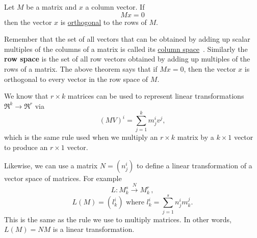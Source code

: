 \begin{theorem}
Let $M$ be a matrix and $x$ a column vector. If 
$$
Mx=0
$$
then the vector $x$ is \hyperlink{orthog}{orthogonal} to the rows of $M$.
\end{theorem}

\begin{remark}
Remember that the set of all vectors that can be obtained by adding up scalar multiples of the columns of a matrix is called its \hyperlink{column space}{column space}~. Similarly the {\bf row space} is the set of all row vectors obtained by adding up multiples of the rows of a matrix. The above theorem says that if $Mx=0$, then the vector $x$ is orthogonal to every vector in the row space of $M$.
\end{remark}



We know that $r\times k$ matrices can be used to represent linear transformations 
$ \Re^k \rightarrow \Re^r $
via $$(MV)^i = \sum_{j=1}^{k} m_j^iv^j , $$ which is the same rule used when we multiply an $r\times k$ matrix by a $k\times 1$ vector to produce an $r\times1$ vector.

Likewise, we can use a matrix $N=(n^i_j)$ to define a linear transformation of a vector space of matrices. For example
\[
L \colon M^s_k \stackrel{N}{\longrightarrow} M^r_k\, ,
\]
\[
L(M)=(l^i_k) \mbox{ where } l^i_k= \sum_{j=1}^{s} n_j^im^j_k.
\]
This is the same as the rule we use to multiply matrices. \hypertarget{leftmult}{In other words,} \(L(M)=NM\) is a linear transformation.


